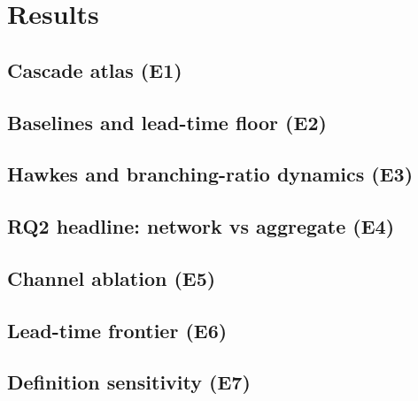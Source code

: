 \section{Results}\label{sec:results}

\subsection{Cascade atlas (E1)}\label{sec:res-atlas}

\subsection{Baselines and lead-time floor (E2)}\label{sec:res-baselines}

\subsection{Hawkes and branching-ratio dynamics (E3)}\label{sec:res-hawkes}

\subsection{RQ2 headline: network vs aggregate (E4)}\label{sec:res-rq2}

\subsection{Channel ablation (E5)}\label{sec:res-channel}

\subsection{Lead-time frontier (E6)}\label{sec:res-frontier}

\subsection{Definition sensitivity (E7)}\label{sec:res-defsens}

